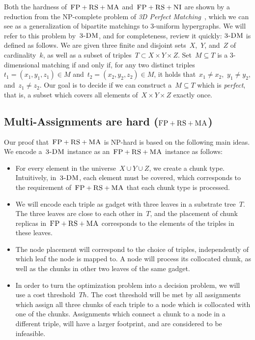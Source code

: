 \documentclass[preprint,12pt]{elsarticle}
\newcommand{\CC}{\textsc{NI}}
\newcommand{\FP}{\textsc{FP}}
\newcommand{\RS}{\textsc{RS}}
\newcommand{\MA}{\textsc{MA}}
\newcommand{\Tree}{\ensuremath{T}}
\newcommand{\TDM}{\textsc{3-DM}}
\newcommand{\Thr}{\ensuremath{Th}}
\begin{document}
Both the hardness of~$\FP+\RS+\MA$ and~$\FP+\RS+\CC$ are shown by a reduction
from the NP-complete problem of \emph{3D Perfect Matching}~\cite{3dmatch},
which we can see as a generalization of bipartite matchings to 3-uniform
hypergraphs. We will refer to this problem by~$\TDM$, and for completeness,
review it quickly:
$\TDM$ is defined as follows. We are given three finite and disjoint
sets~$X$,~$Y$, and~$Z$ of cardinality~$k$, as well as a subset of triples~$T\subset
X \times Y \times Z$.  Set~$M \subseteq T$ is a 3-dimensional matching
if and only if, for any two distinct triples~$t_1=(x_1, y_1, z_1) \in M$
and~$t_2=(x_2, y_2, z_2) \in M$, it holds that~$x_1\neq x_2$,~$y_1\neq
y_2$, and~$z_1\neq z_2$. Our goal is to decide if we can construct
a~$M \subseteq T$ which is \emph{perfect}, that is, a subset which covers all
elements of~$X \times Y \times Z$ exactly once.


\subsection{Multi-Assignments are hard ($\FP+\RS+\MA$)}\label{ssec:fprsma}

Our proof that~$\FP+\RS+\MA$ is NP-hard is based on the following main ideas.
We encode a~$\TDM$ instance as an~$\FP+\RS+\MA$ instance as follows:

 \begin{itemize}
 \item For every element in the universe~$X\cup Y\cup
 Z$, we create a chunk type. Intuitively, in~$\TDM$,
 each element must be covered, which corresponds to the requirement
 of~$\FP+\RS+\MA$
 that each chunk type is processed.

 \item We will encode each triple as gadget with three leaves in
 a substrate tree~$\Tree$. The three leaves are close to each
 other in~$\Tree$, and the placement of chunk replicas in~$\FP+\RS+\MA$
 corresponds to the elements of the
 triples in these leaves.

 \item The node placement will correspond to the choice of triples,
 independently of which
leaf the node is mapped to.
 A node will process its collocated chunk,
 as well as the chunks in other two leaves of the same gadget.

\item In order to turn the optimization problem into a decision problem, we will use
a cost threshold~$\Thr$. The cost threshold will be met by all
assignments which assign all three chunks of each triple to a
node which is collocated with one of the chunks. Assignments which connect a
chunk to a node in a different triple, will have a larger footprint, and are
considered to be infeasible.

\end{itemize}
\end{document}
